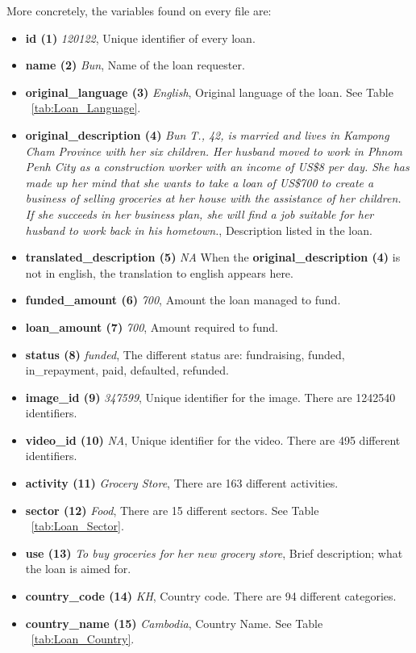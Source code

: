 More concretely, the variables found on every file are:
\begin{itemize}
\item \textbf{id (1)} \textit{120122}, Unique identifier of every loan.
\item \textbf{name (2)} \textit{Bun},  Name of the loan requester.
\item \textbf{original\_language (3)} \textit{English}, Original language of the loan. See Table ~\ref{tab:Loan_Language}.
\item \textbf{original\_description (4)} \textit{Bun T., 42, is married and lives in Kampong Cham Province with her six children. Her husband moved to work in Phnom Penh City as a construction worker with an income of US\$8 per day. She has made up her mind that she wants to take a loan of US\$700 to create a business of selling groceries at her house with the assistance of her children. If she succeeds in her business plan, she will find a job suitable for her husband to work back in his hometown.}, Description listed in the loan.
\item \textbf{translated\_description (5)} \textit{NA} When the \textbf{original\_description (4)} is not in english, the translation to english appears here.
\item \textbf{funded\_amount (6)} \textit{700}, Amount the loan managed to fund.
\item \textbf{loan\_amount (7)} \textit{700}, Amount required to fund.
\item \textbf{status (8)} \textit{funded}, The different status are: fundraising, funded, in\_repayment, paid, defaulted, refunded. 
\item \textbf{image\_id (9)} \textit{347599}, Unique identifier for the image. There are 1242540 identifiers.
\item \textbf{video\_id (10)} \textit{NA}, Unique identifier for the video. There are 495 different identifiers.
\item \textbf{activity (11)} \textit{Grocery Store}, There are 163 different activities.
\item \textbf{sector (12)} \textit{Food}, There are 15 different sectors. See Table ~\ref{tab:Loan_Sector}.
\item \textbf{use (13)} \textit{To buy groceries for her new grocery store}, Brief description; what the loan is aimed for.
\item \textbf{country\_code (14)} \textit{KH}, Country code. There are 94 different categories.
\item \textbf{country\_name (15)} \textit{Cambodia}, Country Name. See Table ~\ref{tab:Loan_Country}.

\end{itemize}
